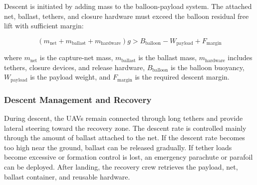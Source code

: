 Descent is initiated by adding mass to the balloon-payload system. The attached net, ballast, tethers, and closure hardware must exceed the balloon residual free lift with sufficient margin:

\begin{equation}
    \left(m_{\mathrm{net}} + m_{\mathrm{ballast}} + m_{\mathrm{hardware}}\right)g 
    >
    B_{\mathrm{balloon}} - W_{\mathrm{payload}} + F_{\mathrm{margin}}
    \label{eq:ballast_descent_condition}
\end{equation}

where \(m_{\mathrm{net}}\) is the capture-net mass, \(m_{\mathrm{ballast}}\) is the ballast mass, \(m_{\mathrm{hardware}}\) includes tethers, closure devices, and release hardware, \(B_{\mathrm{balloon}}\) is the balloon buoyancy, \(W_{\mathrm{payload}}\) is the payload weight, and \(F_{\mathrm{margin}}\) is the required descent margin.

\subsubsection{Descent Management and Recovery}

During descent, the UAVs remain connected through long tethers and provide lateral steering toward the recovery zone. The descent rate is controlled mainly through the amount of ballast attached to the net. If the descent rate becomes too high near the ground, ballast can be released gradually. If tether loads become excessive or formation control is lost, an emergency parachute or parafoil can be deployed. After landing, the recovery crew retrieves the payload, net, ballast container, and reusable hardware.








